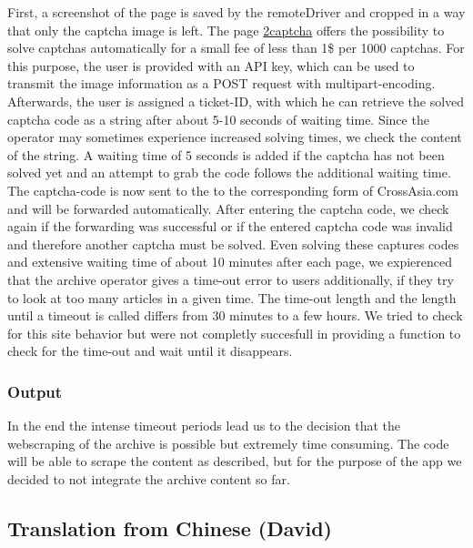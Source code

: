 \documentclass[12pt,a4paper]{article}
\begin{document}
First, a screenshot of the page is saved by the remoteDriver and cropped in a way that only the captcha image is left. The page \href{https://2captcha.com}{2captcha} offers the possibility to solve captchas automatically for a small fee of less than 1\$ per 1000 captchas. For this purpose, the user is provided with an API key, which can be used to transmit the image information as a POST request with multipart-encoding. Afterwards, the user is assigned a ticket-ID, with which he can retrieve the solved captcha code as a string after about 5-10 seconds of waiting time. Since the operator may sometimes experience increased solving times, we check the content of the string. A waiting time of 5 seconds is added if the captcha has not been solved yet and an attempt to grab the code follows the additional waiting time. The captcha-code is now sent to the to the corresponding form of CrossAsia.com and will be forwarded automatically. After entering the captcha code, we check again if the forwarding was successful or if the entered captcha code was invalid and therefore another captcha must be solved. Even solving these captures codes and extensive waiting time of about 10 minutes after each page, we expierenced that the archive operator gives a time-out error to users additionally, if they try to look at too many articles in a given time. The time-out length and the length until a timeout is called differs from 30 minutes to a few hours. We tried to check for this site behavior but were not completly succesfull in providing a function to check for the time-out and wait until it disappears.

\hypertarget{output}{%
\subsubsection{Output}\label{output}}

In the end the intense timeout periods lead us to the decision that the webscraping of the archive is possible but extremely time consuming. The code will be able to scrape the content as described, but for the purpose of the app we decided to not integrate the archive content so far.

\hypertarget{translation-from-chinese-david}{%
\subsection{Translation from Chinese (David)}\label{translation-from-chinese-david}}
\end{document}
